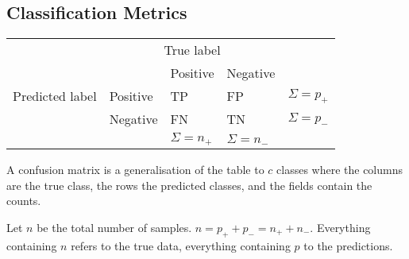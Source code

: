 \subsection{Classification Metrics}
\begin{table}[h]
\begin{tabular}{lllll}
 & \multicolumn{3}{c}{True label}                                                                &      \\ \cline{3-4}
\multirow{3}{*}{Predicted label} & \multicolumn{1}{l|}{}         & \multicolumn{1}{l|}{Positive} & \multicolumn{1}{l|}{Negative} &      \\ \cline{2-4}
                                 & \multicolumn{1}{l|}{Positive} & \multicolumn{1}{l|}{TP}       & \multicolumn{1}{l|}{FP}       & $\Sigma = p_{+}$ \\ \cline{2-4}
                                 & \multicolumn{1}{l|}{Negative} & \multicolumn{1}{l|}{FN}       & \multicolumn{1}{l|}{TN}       & $\Sigma = p_{-}$ \\ \cline{2-4}
                                 &                               & $\Sigma = n_{+}$              & $\Sigma = n_{-}$ &     
\end{tabular}
\end{table}

A confusion matrix is a generalisation of the
table to $c$ classes where the columns are
the true class, the rows the predicted classes,
and the fields contain the counts.

Let $n$ be the total number of samples.
$n = p_{+} + p_{-} = n_{+} + n_{-}$.
Everything containing $n$ refers to the true data,
everything containing $p$ to the predictions.

